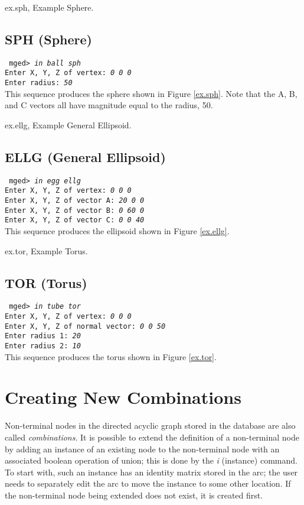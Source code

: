 \mfig ex.sph, Example Sphere.
\subsection{SPH (Sphere)}

{\tt
mged> {\em in ball sph} \\
Enter X, Y, Z of vertex: {\em 0 0 0} \\
Enter radius: {\em 50} \\
}
This sequence produces the sphere shown in Figure \ref{ex.sph}.
Note that the A, B, and C vectors all have magnitude equal to
the radius, 50.

\mfig ex.ellg, Example General Ellipsoid.
\subsection{ELLG (General Ellipsoid)}

{\tt
mged> {\em in egg ellg} \\
Enter X, Y, Z of vertex: {\em 0 0 0} \\
Enter X, Y, Z of vector A: {\em 20 0 0} \\
Enter X, Y, Z of vector B: {\em 0 60 0} \\
Enter X, Y, Z of vector C: {\em 0 0 40} \\
}
This sequence produces the ellipsoid shown in Figure \ref{ex.ellg}.

\mfig ex.tor, Example Torus.
\subsection{TOR (Torus)}

{\tt
mged> {\em in tube tor} \\
Enter X, Y, Z of vertex: {\em 0 0 0} \\
Enter X, Y, Z of normal vector: {\em 0 0 50} \\
Enter radius 1: {\em 20} \\
Enter radius 2: {\em 10} \\
}
This sequence produces the torus shown in Figure \ref{ex.tor}.

\section{Creating New Combinations}

Non-terminal nodes in the directed acyclic graph stored in the database
are also called {\em combinations}.
It is possible to extend the definition of a non-terminal node by
adding an instance of an existing node to the non-terminal node
with an associated boolean
operation of union;  this is done by the {\em i}
(instance) command.  To start with, such an instance has an identity
matrix stored in the arc;  the user needs to separately edit the
arc to move the instance to some other location.
If the non-terminal node being extended does not exist, it is created first.

